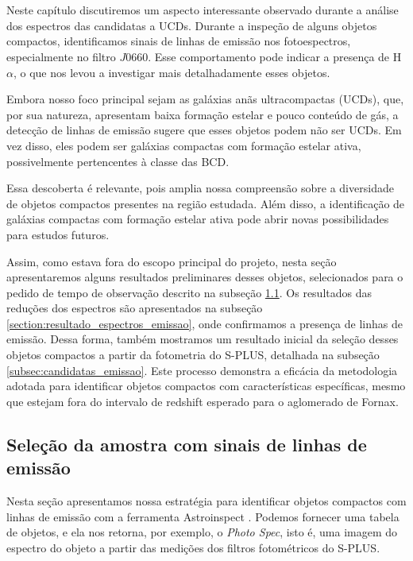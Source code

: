 \chapter{\chapternamespectraemission}\label{chap:spectra_emission}

Neste capítulo discutiremos um aspecto interessante observado durante a análise dos espectros das candidatas a UCDs. Durante a inspeção de alguns objetos compactos, identificamos sinais de linhas de emissão nos fotoespectros, especialmente no filtro $J0660$. Esse comportamento pode indicar a presença de H$\alpha$, o que nos levou a investigar mais detalhadamente esses objetos. 

Embora nosso foco principal sejam as galáxias anãs ultracompactas (UCDs), que, por sua natureza, apresentam baixa formação estelar e pouco conteúdo de gás, a detecção de linhas de emissão sugere que esses objetos podem não ser UCDs. Em vez disso, eles podem ser galáxias compactas com formação estelar ativa, possivelmente pertencentes à classe das \ac{BCD}. 

Essa descoberta é relevante, pois amplia nossa compreensão sobre a diversidade de objetos compactos presentes na região estudada. Além disso, a identificação de galáxias compactas com formação estelar ativa pode abrir novas possibilidades para estudos futuros.

Assim, como estava fora do escopo principal do projeto, nesta seção apresentaremos alguns resultados preliminares desses objetos, selecionados para o pedido de tempo de observação descrito na subseção \ref{section:candidatas_emissao}. Os resultados das reduções dos espectros são apresentados na subseção \ref{section:resultado_espectros_emissao}, onde confirmamos a presença de linhas de emissão. Dessa forma, também mostramos um resultado inicial da seleção desses objetos compactos a partir da fotometria do S-PLUS, detalhada na subseção \ref{subsec:candidatas_emissao}. Este processo demonstra a eficácia da metodologia adotada para identificar objetos compactos com características específicas, mesmo que estejam fora do intervalo de redshift esperado para o aglomerado de Fornax.

\section{Seleção da amostra com sinais de linhas de emissão}\label{section:candidatas_emissao}
Nesta seção apresentamos nossa estratégia para identificar objetos compactos com linhas de emissão com a ferramenta Astroinspect \citep{astroinspect}. Podemos fornecer uma tabela de objetos, e ela nos retorna, por exemplo, o \textit{Photo Spec}, isto é, uma imagem do espectro do objeto a partir das medições dos filtros fotométricos do S-PLUS.

